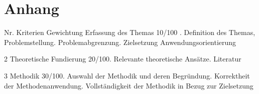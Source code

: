 \documentclass{ffhsthesis}
\begin{document}












\clearpage
\printglossary
\clearpage

\printglossary[type=\acronymtype]


\listoffigures





\newpage



\section*{Anhang}


Nr. Kriterien Gewichtung Erfassung des Themas 10/100 . Definition des Themas, Problemstellung. Problemabgrenzung. Zielsetzung Anwendungsorientierung\newline

2 Theoretische Fundierung 20/100. Relevante theoretische Ansätze. Literatur\newline

3 Methodik 30/100. Auswahl der Methodik und deren Begründung. Korrektheit der Methodenanwendung. Vollständigkeit der Methodik in Bezug zur Zielsetzung\newline
\end{document}
